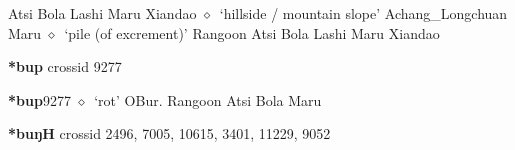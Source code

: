 \begin{list}{}{\leftmargin=1.5em \itemindent=-1.5em}
         Atsi 
\hspace{1ex}
         Bola 
\hspace{1ex}
         Lashi 
\hspace{1ex}
         Maru 
\hspace{1ex}
         Xiandao 
\hspace{1ex}
         $\diamond$~`hillside / mountain slope'
         Achang\_Longchuan 
\hspace{1ex}
         Maru 
\hspace{1ex}
         $\diamond$~`pile (of excrement)'
         Rangoon 
\hspace{1ex}
         Atsi 
\hspace{1ex}
         Bola 
\hspace{1ex}
         Lashi 
\hspace{1ex}
         Maru 
\hspace{1ex}
         Xiandao 
  \end{list}
\item
\textbf{*bup}
  {\tiny crossid 9277}
  \begin{list}{}{\leftmargin=1.5em \itemindent=-1.5em}
  \item {\footnotesize \textbf{*bup}}{\tiny 9277}
         $\diamond$~`rot'
         OBur. 
\hspace{1ex}
         Rangoon 
\hspace{1ex}
         Atsi 
\hspace{1ex}
         Bola 
\hspace{1ex}
         Maru 
  \end{list}
\item
\textbf{*buŋH}
  {\tiny crossid 2496, 7005, 10615, 3401, 11229, 9052}
